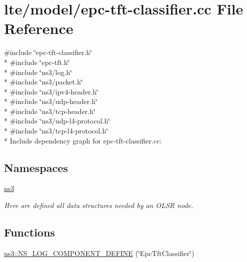 \hypertarget{epc-tft-classifier_8cc}{}\section{lte/model/epc-\/tft-\/classifier.cc File Reference}
\label{epc-tft-classifier_8cc}
{\ttfamily \#include \char`\"{}epc-\/tft-\/classifier.\+h\char`\"{}}\\*
{\ttfamily \#include \char`\"{}epc-\/tft.\+h\char`\"{}}\\*
{\ttfamily \#include \char`\"{}ns3/log.\+h\char`\"{}}\\*
{\ttfamily \#include \char`\"{}ns3/packet.\+h\char`\"{}}\\*
{\ttfamily \#include \char`\"{}ns3/ipv4-\/header.\+h\char`\"{}}\\*
{\ttfamily \#include \char`\"{}ns3/udp-\/header.\+h\char`\"{}}\\*
{\ttfamily \#include \char`\"{}ns3/tcp-\/header.\+h\char`\"{}}\\*
{\ttfamily \#include \char`\"{}ns3/udp-\/l4-\/protocol.\+h\char`\"{}}\\*
{\ttfamily \#include \char`\"{}ns3/tcp-\/l4-\/protocol.\+h\char`\"{}}\\*
Include dependency graph for epc-\/tft-\/classifier.cc\+:
\subsection*{Namespaces}
\begin{DoxyCompactItemize}
\item 
 \hyperlink{namespacens3}{ns3}
\begin{DoxyCompactList}\small\item\em Here are defined all data structures needed by an O\+L\+SR node. \end{DoxyCompactList}\end{DoxyCompactItemize}
\subsection*{Functions}
\begin{DoxyCompactItemize}
\item 
\hyperlink{namespacens3_a61d8d8a196478b08abc86adc655dcf8c}{ns3\+::\+N\+S\+\_\+\+L\+O\+G\+\_\+\+C\+O\+M\+P\+O\+N\+E\+N\+T\+\_\+\+D\+E\+F\+I\+NE} (\char`\"{}Epc\+Tft\+Classifier\char`\"{})
\end{DoxyCompactItemize}
